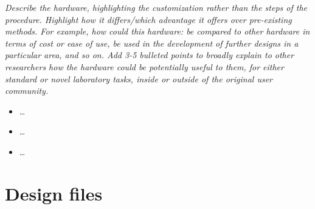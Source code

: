 \documentclass[11pt, letterpaper]{article}
\begin{document}
\textit{Describe the hardware, highlighting the customization rather than the steps of the procedure. Highlight how it differs/which advantage it offers over pre-existing methods. For example, how could this hardware: be compared to other hardware in terms of cost or ease of use, be used in the development of further designs in a particular area, and so on. \linebreak \linebreak Add 3-5 bulleted points to broadly explain to other researchers how the hardware could be potentially useful to them, for either standard or novel laboratory tasks, inside or outside of the original user community.}
\begin{itemize}
\item \dots
\item \dots
\item \dots
\end{itemize}

\section{Design files}
\end{document}
